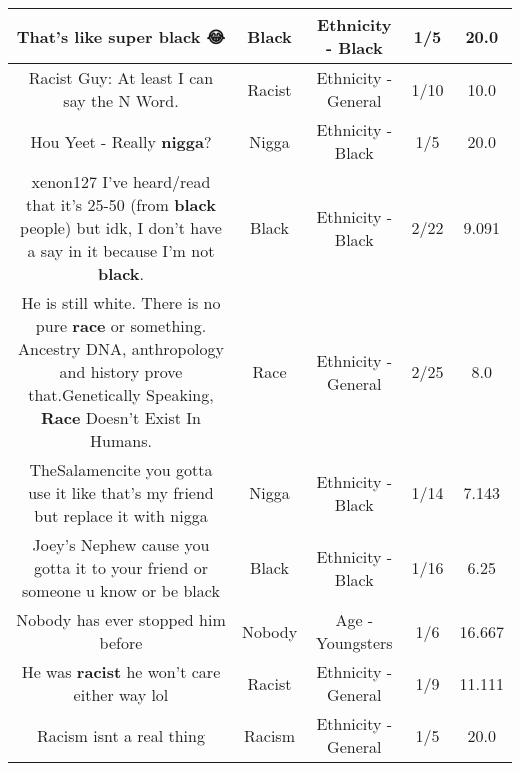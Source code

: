 \documentclass[11pt]{article}
\newlength\mylength
\begin{document}
\begin{center}
\begin{longtable}{|C{.65\mylength}|C{.30\mylength}|C{.12\mylength}|C{.12\mylength}|C{.12\mylength}|}
  \small That's like super \textbf{black} 😂\normalsize   & Black & Ethnicity - Black & 1/5 & 20.0 \\  \hline
  \small Racist Guy: At least I can say the N Word.\normalsize   & Racist & Ethnicity - General & 1/10 & 10.0 \\  \hline
  \small Hou Yeet - Really \textbf{nigga}?\normalsize   & Nigga & Ethnicity - Black & 1/5 & 20.0 \\  \hline
  \small xenon127 I've heard/read that it's 25-50 (from \textbf{black} people) but idk, I don't have a say in it because I'm not \textbf{black}.\normalsize   & Black & Ethnicity - Black & 2/22 & 9.091 \\  \hline
  \small He is still white.  There is no pure \textbf{race} or something. Ancestry DNA, anthropology and history prove that.Genetically Speaking, \textbf{Race} Doesn't Exist In Humans.\normalsize   & Race & Ethnicity - General & 2/25 & 8.0 \\  \hline
  \small TheSalamencite you gotta use it like that's my friend but replace it with nigga\normalsize   & Nigga & Ethnicity - Black & 1/14 & 7.143 \\  \hline
  \small Joey's Nephew cause you gotta it to your friend or someone u know or be black\normalsize   & Black & Ethnicity - Black & 1/16 & 6.25 \\  \hline
  \small Nobody has ever stopped him before\normalsize   & Nobody & Age - Youngsters & 1/6 & 16.667 \\  \hline
  \small He was \textbf{racist} he won't care either way lol\normalsize   & Racist & Ethnicity - General & 1/9 & 11.111 \\  \hline
  \small Racism isnt a real thing\normalsize   & Racism & Ethnicity - General & 1/5 & 20.0 \\  \hline

\end{longtable}
\end{center}
\end{document}
